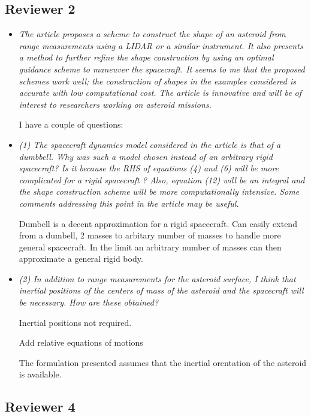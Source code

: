 \documentclass[11pt]{article}
\newcommand{\comment}[1]{\item \itshape #1 \normalfont}
\begin{document}
\subsection*{Reviewer 2}
\begin{itemize}\setlength{\itemsep}{2\parsep}

    
    \comment{The article proposes a scheme to construct the shape of an asteroid from range measurements using a LIDAR or a similar instrument. 
        It also presents a method to further refine the shape construction by using an optimal guidance scheme to maneuver the spacecraft. 
        It seems to me that the proposed schemes work well; the construction of shapes in the examples considered is accurate with low computational cost. 
        The article is innovative and will be of interest to researchers working on asteroid missions.   

        I have a couple of questions:
    }


\comment{(1) The spacecraft dynamics model considered in the article is that of a dumbbell. 
Why was such a model chosen instead of an arbitrary rigid spacecraft?
Is it because the RHS of equations (4) and (6) will be more complicated for a rigid spacecraft ?
Also, equation (12) will be an integral and the shape construction scheme will be more computationally intensive.
Some comments addressing this point in the article may be useful.}

Dumbell is a decent approximation for a rigid spacecraft.
Can easily extend from a dumbell, 2 masses to arbitary number of masses to handle more general spacecraft. 
In the limit an arbitrary number of masses can then approximate a general rigid body.

\comment{(2) In addition to range measurements for the asteroid surface, I think that inertial positions of the centers of mass of the asteroid and the spacecraft will be necessary.
How are these obtained?}

Inertial positions not required.

Add relative equations of motions

The formulation presented assumes that the inertial orentation of the asteroid is available.

\end{itemize}


\clearpage\newpage
\subsection*{Reviewer 4}
\end{document}
